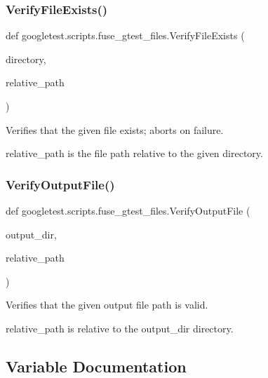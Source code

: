 \subsubsection{\texorpdfstring{VerifyFileExists()}{VerifyFileExists()}}
{\footnotesize\ttfamily def googletest.\+scripts.\+fuse\+\_\+gtest\+\_\+files.\+Verify\+File\+Exists (\begin{DoxyParamCaption}\item[{}]{directory,  }\item[{}]{relative\+\_\+path }\end{DoxyParamCaption})}

\begin{DoxyVerb}Verifies that the given file exists; aborts on failure.

relative_path is the file path relative to the given directory.
\end{DoxyVerb}
 \mbox{\label{namespacegoogletest_1_1scripts_1_1fuse__gtest__files_ac65d4b5ec0f4ee8963255a8a21811037}} 
\subsubsection{\texorpdfstring{VerifyOutputFile()}{VerifyOutputFile()}}
{\footnotesize\ttfamily def googletest.\+scripts.\+fuse\+\_\+gtest\+\_\+files.\+Verify\+Output\+File (\begin{DoxyParamCaption}\item[{}]{output\+\_\+dir,  }\item[{}]{relative\+\_\+path }\end{DoxyParamCaption})}

\begin{DoxyVerb}Verifies that the given output file path is valid.

relative_path is relative to the output_dir directory.
\end{DoxyVerb}
 

\subsection{Variable Documentation}
\mbox{\label{namespacegoogletest_1_1scripts_1_1fuse__gtest__files_aa7e865995867f1d5371585bf2f1927c1}} 
